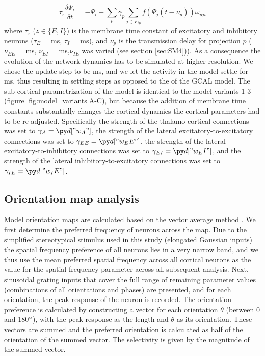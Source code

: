\documentclass[utf8]{frontiersSCNS}
\begin{document}
\begin{equation}
\tau_{z} \frac{\delta\Psi_{i}}{\delta t} = - \Psi_{i} + \sum_{p}\gamma_{p}\sum_{j\in F_{ip}}f(\Psi_{j}(t-\nu_{p}))\omega_{pji} 
\end{equation}
\noindent where $\tau_{z}$ ($z \in \{E,I\}$) is the membrane time constant of excitatory and inhibitory neurons 
($\tau_{E}$ =  ms, $\tau_{I}$ =  ms), and $\nu_{p}$ is the transmission delay 
for projection $p$ ($\nu_{EE}$ = ms, $\nu_{EI}$ =  ms,$\nu_{IE}$ was varied (see section \ref{sec:SM4})).
As a consequence the evolution of the network dynamics has to be simulated at higher resolution. We chose the update step to be ms, and we let the activity in the model settle for ms, thus resulting in  settling steps as opposed to the  of the GCAL model. The sub-cortical parametrization of the model is identical to the model variants 1-3 (figure \ref{fig:model_variants}A-C), but because the addition of membrane time constants substantially changes the cortical dynamics
the cortical parameters had to be re-adjusted. Specifically the strength of the thalamo-cortical connections was set to $\gamma_{A}=\insval{w_A}$,
the strength of the lateral excitatory-to-excitatory connections was set to $\gamma_{EE}=\insval{w_EE}$, the strength of the lateral excitatory-to-inhibitory connections was set to $\gamma_{EI}=\insval{w_EI}$, and the strength of the lateral inhibitory-to-excitatory connections was set to $\gamma_{IE}=\insval{w_IE}$.

\subsection{Orientation map analysis}

Model orientation maps are calculated based on the vector average method \citep{CMVC}. We first determine the preferred frequency of neurons 
across the map. Due to the simplified stereotypical stimulus used in this study (elongated Gaussian inputs) the spatial frequency 
preference of all neurons lies in a very narrow band, and we thus use the mean preferred spatial frequency across all cortical neurons as the
value for the spatial frequency parameter across all subsequent analysis. Next, sinusoidal grating inputs that cover the full range of remaining parameter values (combinations of all orientations and phases) are presented, and for each orientation, the peak response of the neuron is recorded. The orientation preference is calculated by constructing a vector for each orientation $\theta$ (between 0 and 180$\degree$), with the peak response as
the length and $\theta$ as its orientation. These vectors are summed and the preferred orientation is calculated as half of the orientation of the summed vector. The selectivity is given by the magnitude of the summed vector. 
\end{document}
